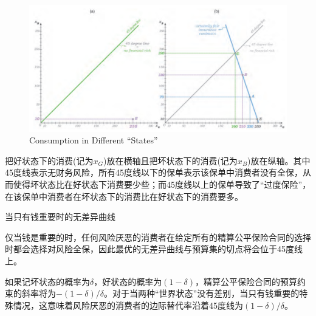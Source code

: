 \documentclass{article}
\begin{document}
\begin{figure}[H] %
	\centering %
	\includegraphics[width=1\textwidth]{17_3} %
	\caption{Consumption in Different “States”} %
	\label{Fig.main4} %
\end{figure}

把好状态下的消费(记为$ x_G $)放在横轴且把坏状态下的消费(记为$ x_B $)放在纵轴。其中45度线表示无财务风险，所有45度线以下的保单表示该保单中消费者没有全保，从而使得坏状态比在好状态下消费要少些；而45度线以上的保单导致了“过度保险”，在该保单中消费者在坏状态下的消费比在好状态下的消费要多。

\hspace*{\fill}

当只有钱重要时的无差异曲线

仅当钱是重要的时，任何风险厌恶的消费者在给定所有的精算公平保险合同的选择时都会选择对风险全保，因此最优的无差异曲线与预算集的切点将会位于45度线上。

如果记坏状态的概率为$ \delta $，好状态的概率为$ (1-\delta) $，精算公平保险合同的预算约束的斜率将为$ -(1-\delta)/\delta $。对于当两种“世界状态”没有差别，当只有钱重要的特殊情况，这意味着风险厌恶的消费者的边际替代率沿着45度线为$ (1-\delta)/\delta $。
\end{document}
